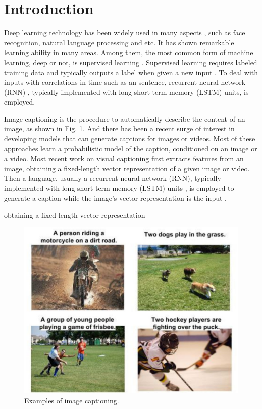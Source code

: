 \documentclass[conference]{IEEEtran}
\begin{document}
\IEEEpeerreviewmaketitle



\section{Introduction}

Deep learning technology has been widely used in many aspects \cite{krizhevsky2012imagenet}, such as face recognition, natural language processing and etc. It has shown remarkable learning ability in many areas. Among them, the most common form of machine learning, deep or not, is supervised learning \cite{lecun2015deep}. Supervised learning requires labeled training data and typically outputs a label when given a new input \cite{lecun1998gradient}. To deal with inputs with correlations in time such as an sentence, recurrent neural network (RNN) \cite{mikolov2010recurrent}, typically implemented with long short-term memory (LSTM) units, is employed.

Image captioning is the procedure to automatically describe the content of an image, as shown in Fig. \ref{cap_fig}. And there has been a recent surge of interest in developing models that can generate captions for images or videos. Most of these approaches learn a probabilistic model of the caption, conditioned on an image or a video. Most recent work on visual captioning first extracts features from an image, obtaining a fixed-length vector representation of a given image or video. Then a language, usually a recurrent neural network (RNN), typically implemented with long short-term memory (LSTM) units \cite{graves2013speech}, is employed to generate a caption while the image's vector representation is the input \cite{vinyals2015show}.

obtaining a fixed-length vector representation
\begin{figure}
  \centering
  \includegraphics[width=1.0\linewidth]{figures/caption.pdf}
  \caption{Examples of image captioning.}\label{cap_fig}
\end{figure}
\end{document}

